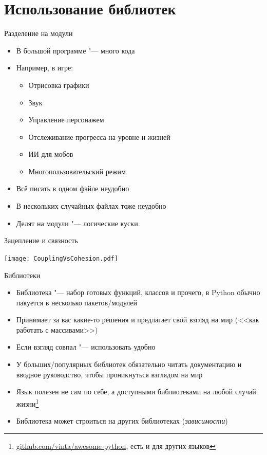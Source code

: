 \section{Использование библиотек}
\begin{frame}[t]{Разделение на модули}
	\begin{itemize}
	\item
		В большой программе "--- много кода
	\item
		Например, в игре:
		\begin{itemize}
		\item Отрисовка графики
		\item Звук
		\item Управление персонажем
		\item Отслеживание прогресса на уровне и жизней
		\item ИИ для мобов
		\item Многопользовательский режим
		\end{itemize}
	\item
		Всё писать в одном файле неудобно
	\item
		В нескольких случайных файлах тоже неудобно
	\item
		Делят на модули "--- логические куски.
	\end{itemize}
\end{frame}

\begin{frame}[t]{Зацепление и связность}
	\begin{center}
		\texttt{[image: CouplingVsCohesion.pdf]}
	\end{center}
\end{frame}

\begin{frame}[t]{Библиотеки}
	\begin{itemize}
	\item
		Библиотека "--- набор готовых функций, классов и прочего,
		в Python обычно пакуется в несколько пакетов/модулей
	\item
		Принимает за вас какие-то решения и предлагает
		свой взгляд на мир (<<как работать с массивами>>)
	\item
		Если взгляд совпал "--- использовать удобно
	\item
		У больших/популярных библиотек обязательно читать
		документацию и вводное руководство, чтобы проникнуться
		взглядом на мир
	\item
		Язык полезен не сам по себе, а доступными библиотеками
		на любой случай жизни\footnote{\href{https://github.com/vinta/awesome-python}{github.com/vinta/awesome-python}, есть и для других языков}
	\item
		Библиотека может строиться на других библиотеках (\textit{зависимости})
	\end{itemize}
\end{frame}

